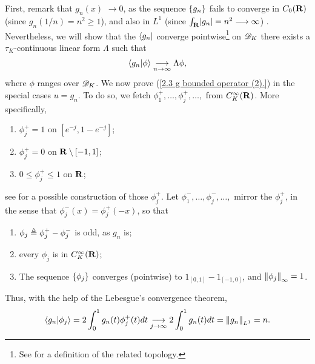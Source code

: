 %
First, remark that $g_n(x)$ $\longrightarrow 0$, %
as the sequence $\singleton{g_n}$ fails to converge in $C_0(\R)$ %
%
  (since $g_n(1/n)= n^2 \geq 1$),  %
%
and also in $L^1$ %
%
  (since $\int_\R \lvert g_n \rvert = n^2 \longrightarrow{\infty}$)
. %
Nevertheless, we will show that %
%
  the $\bra{g_n}$ %
%
converge pointwise\footnote{
%
  See  for a definition of the related topology. %
%
} on $\D_K$ %
\ie %
there exists a $\tau_K$-continuous linear form $\Lambda$ such that %
%
  \begin{align}\label{2.3. Convergence in D_K, not vague.}
    \bra{g_n}\ket{\phi} \tendsto{n}{\infty} \Lambda \phi, %
  \end{align}
%
where $\phi$ ranges over $\D_K$. %
%
We now prove (\ref{2.3  g  bounded operator (2).}) in the special cases %
%
  $u = g_n$. %
%
To do so, we fetch %
%
  $\phi^{+}_{1}, \dots, \phi^{+}_{j}, \dots,$ from $C_K^\infty(\R)$. %
%
More specifically, %
%
  \begin{enumerate}
    \item{
      $\phi^{+}_{j} = 1$ on $[e^{\minus j}, 1-e^{\minus j}]$; 
    }%
    \item{
      $\phi^{+}_{j} = 0$ on $\R\setminus [-1, 1]$;%
    }
    \item{
      $0 \leq \phi^{+}_{j} \leq 1$ on $\R$; %
    }
  \end{enumerate}
%
see \citeresultFA{[1.46]} for a possible construction of those $\phi^{+}_{j}$. 
%
Let %
%
  $\phi^{-}_{1}, \dots, \phi^{-}_{j}, \dots,$ %
%
mirror the $\phi^{+}_{j}$, in the sense that %
%
  $\phi^{-}_{j}(x) = \phi^{+}_{j}(\minus x)$, %
%
so that %
%
  \begin{enumerate}\addtocounter{enumi}{3}
    \item{
      $\phi_{j} \Def \phi^{+}_{j} - \phi^{-}_{j}$ is odd, as $g_n$ is;
    }
    \item{
      every $\phi_{j}$ is in $C_K^\infty(\R)$;
    }
    \item{
      The sequence $\singleton{\phi_j}$ converges (pointwise) to %
      $1_{[0, 1]} - 1_{[\minus 1, 0]}$, and $\norma{\infty}{\phi_{j}} = 1$. %
    }
  \end{enumerate}
%
Thus, with the help of the Lebesgue's convergence theorem, 
%
  \begin{align}\label{2.3. Norm in the dual equals norm L1 (1).}
      \langle{g_n}\lvert{\phi_j}\rangle
      = 
    2 \int_{0}^1 g_n(t) \phi^{+}_{j}(t) d t
      \tendsto{j}{\infty} 
    2 \int_{0}^1 g_n(t) d t
      = \norma{L^1}{g_n} = n.
  \end{align}
